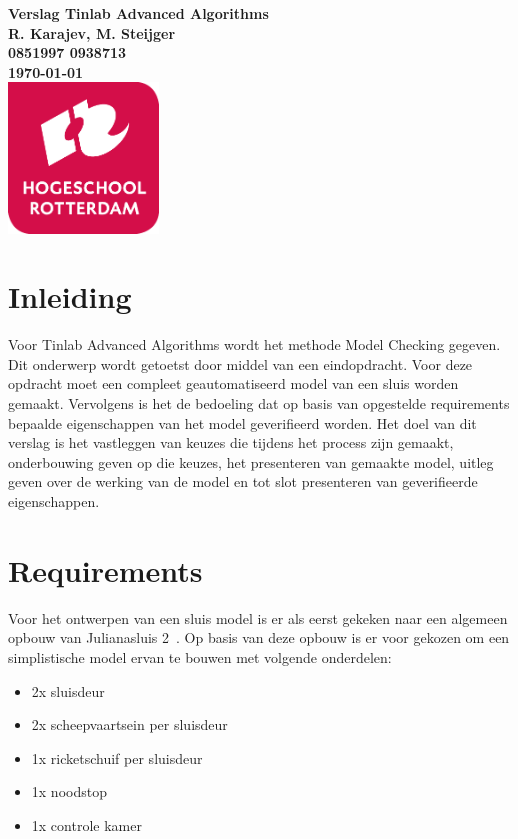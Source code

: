 \documentclass{article}
\begin{document}
\sffamily
\begin{titlepage}
  \centering
    \vfill
    {
        \bfseries\Huge Verslag Tinlab Advanced Algorithms \\
        \vskip2cm
        }
        {\bfseries\Large
          R. Karajev, M. Steijger\\
        }
        {
          \bfseries\normalsize
          0851997 0938713\\
          \vskip1cm
          \today\\
    }    
    \vfill
    \includegraphics[width=4cm]{logohr.png} %
    \vfill
    \vfill
\end{titlepage}

\newpage
\tableofcontents


\newpage
\section{Inleiding}
    Voor Tinlab Advanced Algorithms wordt het methode Model Checking gegeven. Dit
    onderwerp wordt getoetst door middel van een eindopdracht. Voor deze opdracht 
    moet een compleet geautomatiseerd model van een sluis worden gemaakt. Vervolgens 
    is het de bedoeling dat op basis van opgestelde requirements bepaalde eigenschappen 
    van het model geverifieerd worden. Het doel van dit verslag is het vastleggen 
    van keuzes die tijdens het process zijn gemaakt, onderbouwing geven op die keuzes,
    het presenteren van gemaakte model, uitleg geven over de werking van de model en
    tot slot presenteren van geverifieerde eigenschappen.

\newpage
\section {Requirements}
    Voor het ontwerpen van een sluis model is er als eerst gekeken naar een algemeen
    opbouw van Julianasluis 2~\cite{bedienininstructie}. Op basis van deze opbouw is
    er voor gekozen om een simplistische model ervan te bouwen met volgende
    onderdelen:
        \begin{itemize}
            \item 2x sluisdeur
            \item 2x scheepvaartsein per sluisdeur
            \item 1x ricketschuif per sluisdeur
            \item 1x noodstop
            \item 1x controle kamer
        \end{itemize}
    
\end{document}
